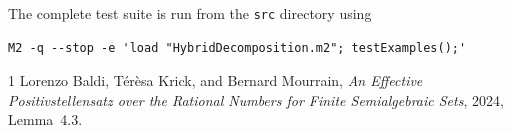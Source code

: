\documentclass{weeklyprogress}
\begin{document}
The complete test suite is run from the \verb|src| directory using
\begin{verbatim}
M2 -q --stop -e 'load "HybridDecomposition.m2"; testExamples();'
\end{verbatim}

\begin{thebibliography}{1}
  Lorenzo Baldi, T\'er\`esa Krick, and Bernard Mourrain,
  \emph{An Effective Positivstellensatz over the Rational Numbers for
  Finite Semialgebraic Sets}, 2024, Lemma~4.3.
\end{thebibliography}
\end{document}
